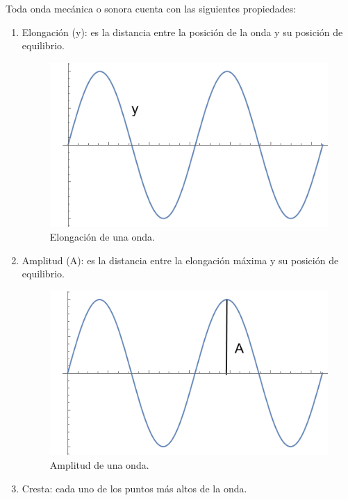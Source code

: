 \documentclass[12pt, letter]{article}
\begin{document}
Toda onda mecánica o sonora cuenta con las siguientes propiedades:
\begin{enumerate}
\item Elongación (y): es la distancia entre la posición de la onda y su posición de equilibrio.
\begin{figure}[H]
    \centering
    \includegraphics[scale=0.8]{Imagenes/Plot_Onda_02.png}
    \caption{Elongación de una onda.}
\end{figure}
\item Amplitud (A): es la distancia entre la elongación máxima y su posición de equilibrio.
\begin{figure}[H]
    \centering
    \includegraphics[scale=0.8]{Imagenes/Plot_Onda_03.png}
    \caption{Amplitud de una onda.}
\end{figure}
\item Cresta: cada uno de los puntos más altos de la onda.
\begin{figure}[H]
    \centering

\end{figure}
\end{enumerate}
\end{document}

